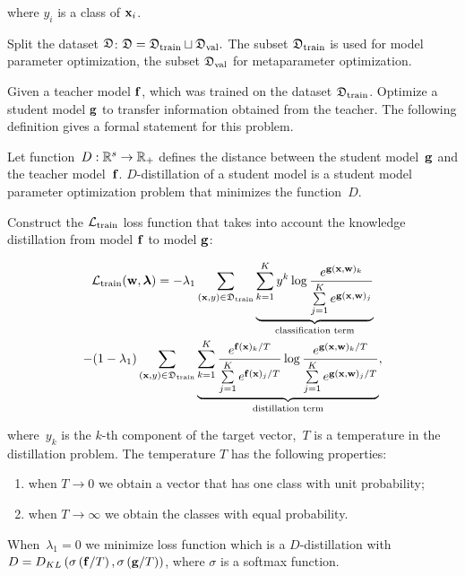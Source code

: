 \documentclass[runningheads]{llncs}
\begin{document}
\noindent
where $y_i$ is a class of $\mathbf{x}_i$.

Split the dataset $\mathfrak{D}$: $\mathfrak{D} = \mathfrak{D}_\text{train} \sqcup \mathfrak{D}_\text{val}.$ The subset $\mathfrak{D}_\text{train}$ is used for model parameter optimization, the subset $\mathfrak{D}_\text{val}$ for metaparameter optimization.

Given a teacher model $\mathbf{f}$, which was trained on the dataset $\mathfrak{D}_\text{train}$. Optimize a student model $\mathbf{g}$ to transfer information obtained from  the teacher. The following definition gives a formal statement for this problem.

\begin{definition}
Let function~$D: \mathbb{R}^s \to \mathbb{R}_{+}$ defines the distance between the student model~$\mathbf{g}$ and the teacher model~$\mathbf{f}$. $D$-distillation of a student model is a student model parameter optimization problem that minimizes the function~$D$.
\end{definition}

Construct the $\mathcal{L}_\text{train}$ loss function that takes into account the knowledge distillation from model $\mathbf{f}$ to model $\mathbf{g}$:

\begin{multline*}
    \mathcal{L}_\text{train}(\mathbf{w}, \boldsymbol{\lambda}) = -\lambda_1\sum\limits_{(\mathbf{x}, y) \in \mathfrak{D}_\text{train}}\underbrace{\sum\limits_{k=1}^{K}y^k\log \frac{e^{\mathbf{g}(\mathbf{x}, \mathbf{w})_k}}{\sum\limits_{j=1}^{K}e^{\mathbf{g}(\mathbf{x}, \mathbf{w})_j}}}_{\text{classification term}} \\- (1 - \lambda_1)\sum\limits_{(\mathbf{x}, y) \in \mathfrak{D}_\text{train}}\underbrace{\sum\limits_{k=1}^{K}\frac{e^{\mathbf{f}(\mathbf{x})_k/T}}{\sum\limits_{j=1}^{K}e^{\mathbf{f}(\mathbf{x})_j/T}}\log \frac{e^{\mathbf{g}(\mathbf{x}, \mathbf{w})_k/T}}{\sum\limits_{j=1}^{K}e^{\mathbf{g}(\mathbf{x}, \mathbf{w})_j/T}}}_{\text{distillation term}},
\end{multline*}

\noindent
where~$y_k$ is the $k$-th component of the target vector,~$T$ is a temperature in the distillation problem. The temperature $T$ has the following properties:

\begin{enumerate}[{1)}]
    \item when $T \rightarrow 0$ we obtain a vector that has one class with unit probability;
    \item when $T \rightarrow \infty$ we obtain the classes with equal probability.
\end{enumerate}

\begin{lemma}
When~$\lambda_1 = 0$ we minimize loss function which is a $D$-distillation with $D = D_{KL}\left(\sigma\left(\mathbf{f}/T\right), \sigma\left(\mathbf{g}/T\right)\right)$, where $\sigma$ is a softmax function.
\end{lemma}
\end{document}
